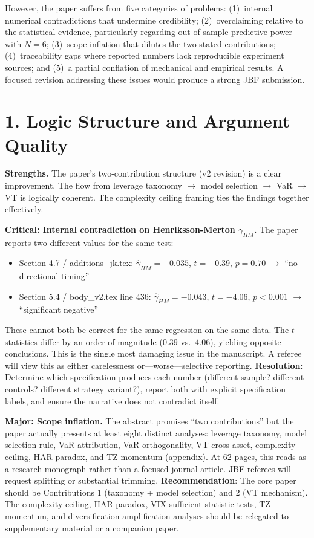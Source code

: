 \documentclass[12pt,a4paper]{article}
\begin{document}
However, the paper suffers from five categories of problems: (1)~internal numerical contradictions that undermine credibility; (2)~overclaiming relative to the statistical evidence, particularly regarding out-of-sample predictive power with $N=6$; (3)~scope inflation that dilutes the two stated contributions; (4)~traceability gaps where reported numbers lack reproducible experiment sources; and (5)~a partial conflation of mechanical and empirical results. A focused revision addressing these issues would produce a strong JBF submission.

\bigskip

\section*{1. Logic Structure and Argument Quality}

\textcolor{okgreen}{\textbf{Strengths.}} The paper's two-contribution structure (v2 revision) is a clear improvement. The flow from leverage taxonomy $\to$ model selection $\to$ VaR $\to$ VT is logically coherent. The complexity ceiling framing ties the findings together effectively.

\textcolor{errorred}{\textbf{Critical: Internal contradiction on Henriksson-Merton $\gamma_{HM}$.}} The paper reports two different values for the same test:
\begin{itemize}[nosep]
\item Section 4.7 / additions\_jk.tex: $\hat{\gamma}_{HM} = -0.035$, $t = -0.39$, $p = 0.70$ $\to$ ``no directional timing''
\item Section 5.4 / body\_v2.tex line 436: $\hat{\gamma}_{HM} = -0.043$, $t = -4.06$, $p < 0.001$ $\to$ ``significant negative''
\end{itemize}
These cannot both be correct for the same regression on the same data. The $t$-statistics differ by an order of magnitude ($0.39$ vs.\ $4.06$), yielding opposite conclusions. This is the single most damaging issue in the manuscript. A referee will view this as either carelessness or---worse---selective reporting. \textbf{Resolution}: Determine which specification produces each number (different sample? different controls? different strategy variant?), report both with explicit specification labels, and ensure the narrative does not contradict itself.

\textcolor{warncolor}{\textbf{Major: Scope inflation.}} The abstract promises ``two contributions'' but the paper actually presents at least eight distinct analyses: leverage taxonomy, model selection rule, VaR attribution, VaR orthogonality, VT cross-asset, complexity ceiling, HAR paradox, and TZ momentum (appendix). At 62 pages, this reads as a research monograph rather than a focused journal article. JBF referees will request splitting or substantial trimming. \textbf{Recommendation}: The core paper should be Contributions 1 (taxonomy + model selection) and 2 (VT mechanism). The complexity ceiling, HAR paradox, VIX sufficient statistic tests, TZ momentum, and diversification amplification analyses should be relegated to supplementary material or a companion paper.
\end{document}
